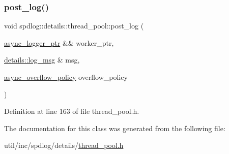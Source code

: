 \subsubsection{\texorpdfstring{post\+\_\+log()}{post\_log()}}
{\footnotesize\ttfamily void spdlog\+::details\+::thread\+\_\+pool\+::post\+\_\+log (\begin{DoxyParamCaption}\item[{\hyperlink{namespacespdlog_1_1details_a9b6989c16b6150f7e4658ea2aee01bc2}{async\+\_\+logger\+\_\+ptr} \&\&}]{worker\+\_\+ptr,  }\item[{\hyperlink{structspdlog_1_1details_1_1log__msg}{details\+::log\+\_\+msg} \&}]{msg,  }\item[{\hyperlink{namespacespdlog_a42e109759a11c9514d3f6313a7709852}{async\+\_\+overflow\+\_\+policy}}]{overflow\+\_\+policy }\end{DoxyParamCaption})\hspace{0.3cm}{\ttfamily [inline]}}



Definition at line 163 of file thread\+\_\+pool.\+h.



The documentation for this class was generated from the following file\+:\begin{DoxyCompactItemize}
\item 
util/inc/spdlog/details/\hyperlink{thread__pool_8h}{thread\+\_\+pool.\+h}\end{DoxyCompactItemize}
